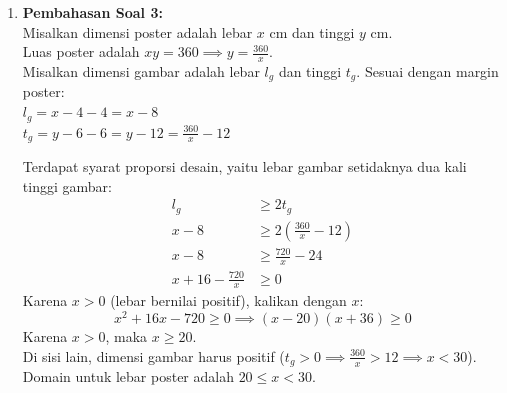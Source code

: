 \documentclass[11pt,openany,a4paper]{article}
\begin{document}
\begin{enumerate}
\begin{enumerate}
\begin{itemize}
                  \item $g \circ f$: \\
                        $(g \circ f)(x) = g(f(x)) = \sqrt{\frac{2x-1}{x+2} - 1} = \sqrt{\frac{x-3}{x+2}}$. \\
                        Domain $g \circ f$: $x \in D_f \land f(x) \in D_g$. \\
                        $x \ne -2 \land \frac{2x-1}{x+2} \ge 1 \implies \frac{x-3}{x+2} \ge 0$. \\
                        Pembuat nol pembilang dan penyebut adalah $x = 3$ dan $x = -2$. \\
                        Melalui uji garis bilangan, penyelesaiannya adalah $x < -2$ atau $x \ge 3$. \\
                        $D_{g \circ f} = (-\infty, -2) \cup [3, \infty)$.
                \end{itemize}
        \end{enumerate}

  \item \textbf{Pembahasan Soal 3:} \\
        Misalkan dimensi poster adalah lebar $x$ cm dan tinggi $y$ cm. \\
        Luas poster adalah $xy = 360 \implies y = \frac{360}{x}$. \\
        Misalkan dimensi gambar adalah lebar $l_g$ dan tinggi $t_g$.
        Sesuai dengan margin poster: \\
        $l_g = x - 4 - 4 = x - 8$ \\
        $t_g = y - 6 - 6 = y - 12 = \frac{360}{x} - 12$
        
        Terdapat syarat proporsi desain, yaitu lebar gambar setidaknya dua kali tinggi gambar:
        \begin{align*}
          l_g &\ge 2t_g \\
          x - 8 &\ge 2 \left( \frac{360}{x} - 12 \right) \\
          x - 8 &\ge \frac{720}{x} - 24 \\
          x + 16 - \frac{720}{x} &\ge 0
        \end{align*}
        Karena $x > 0$ (lebar bernilai positif), kalikan dengan $x$:
        \[
          x^2 + 16x - 720 \ge 0 \implies (x - 20)(x + 36) \ge 0
        \]
        Karena $x > 0$, maka $x \ge 20$. \\
        Di sisi lain, dimensi gambar harus positif ($t_g > 0 \implies \frac{360}{x} > 12 \implies x < 30$). \\
        Domain untuk lebar poster adalah $20 \le x < 30$.
        

\end{enumerate}
\end{document}
